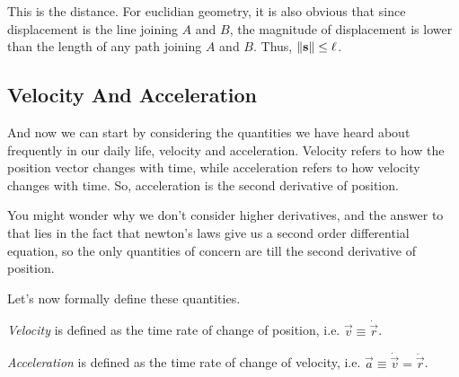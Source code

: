 This is the distance. For euclidian geometry, it is also obvious that since displacement is the line joining 
$A$ and $B$, the magnitude of displacement is lower than the length of any path joining $A$ and $B$. Thus,
$\norm{\mathbf{\boldsymbol{s}}} \le \ell$. 

\subsection{Velocity And Acceleration}

And now we can start by considering the quantities we have heard about frequently
in our daily life, velocity and acceleration. Velocity refers to how the position
vector changes with time, while acceleration refers to how velocity changes with time.
So, acceleration is the second derivative of position. 

You might wonder why we don't consider higher derivatives, and the answer to that lies in the 
fact that newton's laws give us a second order differential equation, so the only 
quantities of concern are till the second derivative of position.

Let's now formally define these quantities.

\begin{definition}
    \textit{Velocity} is defined as the time rate of change of position, i.e. $\vec{v} \equiv \dot{\vec{r}}$.

    \textit{Acceleration} is defined as the time rate of change of velocity, i.e. $\vec{a} \equiv \dot{\vec{v}} = \ddot{\vec{r}}$. 
\end{definition}


